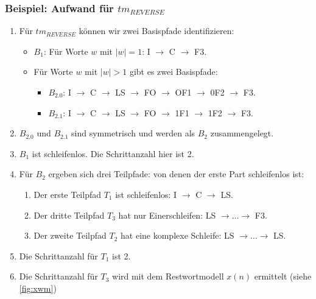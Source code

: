 \subsubsection{Beispiel: Aufwand für $tm_{REVERSE}$}


\begin{enumerate}
        \item Für $tm_{REVERSE}$ können wir zwei Basispfade identifizieren:
            \begin{itemize}
                \item $B_1$: Für Worte $w$ mit $|w| = 1$: I $\rightarrow$ C $\rightarrow$ F3.\\
                \item Für Worte $w$ mit $|w| > 1$ gibt es zwei Basispfade:\\
                    \begin{itemize}
                        \item $B_{2.0}$: I $\rightarrow$ C $\rightarrow$ LS $\rightarrow$ FO $\rightarrow$ OF1 $\rightarrow$ 0F2 $\rightarrow$ F3.\\
                        \item $B_{2.1}$: I $\rightarrow$ C $\rightarrow$ LS $\rightarrow$ FO $\rightarrow$ 1F1 $\rightarrow$ 1F2 $\rightarrow$ F3.\\
                    \end{itemize}
            \end{itemize}
        \item $B_{2.0}$ und $B_{2.1}$ sind symmetrisch und werden als $B_2$ zusammengelegt.
        \item $B_1$ ist schleifenlos. Die Schrittanzahl hier ist 2.
        \item Für $B_2$ ergeben sich drei Teilpfade: von denen der erste Part schleifenlos ist:
            \begin{enumerate}
                \item Der erste Teilpfad $T_1$ ist schleifenlos: I $\rightarrow$ C $\rightarrow$ LS.\@
                \item Der dritte Teilpfad $T_3$ hat nur Einerschleifen: LS $\rightarrow \ldots \rightarrow$ F3.\@
                \item Der zweite Teilpfad $T_2$ hat eine komplexe Schleife: LS $\rightarrow \ldots \rightarrow$ LS.\@
            \end{enumerate}
        \item Die Schrittanzahl für $T_1$ ist 2.
        \item Die Schrittanzahl für $T_3$ wird mit dem Restwortmodell $x(n)$ ermittelt (siehe \autoref{fig:xwm})

\end{enumerate}
